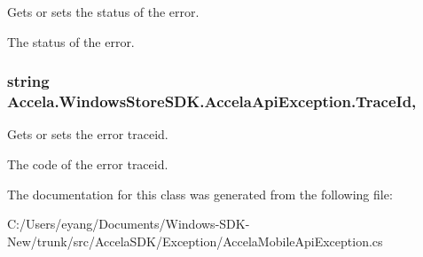 Gets or sets the status of the error. 

The status of the error.\hypertarget{class_accela_1_1_windows_store_s_d_k_1_1_accela_api_exception_ab6ac5f7216b4cefa84354ecdf082f5db}{
\subsubsection[{Trace\+Id}]{\setlength{\rightskip}{0pt plus 5cm}string Accela.\+Windows\+Store\+S\+D\+K.\+Accela\+Api\+Exception.\+Trace\+Id\hspace{0.3cm}{\ttfamily [get]}, {\ttfamily [set]}}}\label{class_accela_1_1_windows_store_s_d_k_1_1_accela_api_exception_ab6ac5f7216b4cefa84354ecdf082f5db}


Gets or sets the error traceid. 

The code of the error traceid.

The documentation for this class was generated from the following file\+:\begin{DoxyCompactItemize}
\item 
C\+:/\+Users/eyang/\+Documents/\+Windows-\/\+S\+D\+K-\/\+New/trunk/src/\+Accela\+S\+D\+K/\+Exception/Accela\+Mobile\+Api\+Exception.\+cs\end{DoxyCompactItemize}
